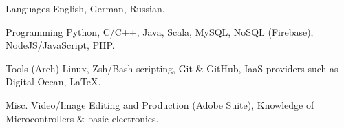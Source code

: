 

\begin{cvskills}

\cvskill
  {Languages} %
  {English, German, Russian.} %

  \cvskill
    {Programming} %
    {Python, C/C++, Java, Scala, MySQL, NoSQL (Firebase), NodeJS/JavaScript, PHP.} %

  \cvskill
    {Tools} %
    {(Arch) Linux, Zsh/Bash scripting, Git \& GitHub, IaaS providers such as Digital Ocean, LaTeX.} %

  \cvskill
    {Misc.} %
    {Video/Image Editing and Production (Adobe Suite), Knowledge of Microcontrollers \& basic electronics.} %

\end{cvskills}
